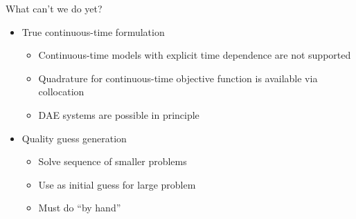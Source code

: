 \documentclass[xcolor=dvipsnames]{beamer}
\begin{document}
\begin{frame}{What can't we do yet?}
    \begin{itemize}
        \item True continuous-time formulation
        \begin{itemize}
            \item Continuous-time models with explicit time dependence are not supported
            \item Quadrature for continuous-time objective function is available via collocation
            \item DAE systems are possible in principle
        \end{itemize}
        \item Quality guess generation
        \begin{itemize}
            \item Solve sequence of smaller problems
            \item Use as initial guess for large problem
            \item Must do ``by hand''
        \end{itemize}
    \end{itemize}
\end{frame}

%
%
\end{document}
